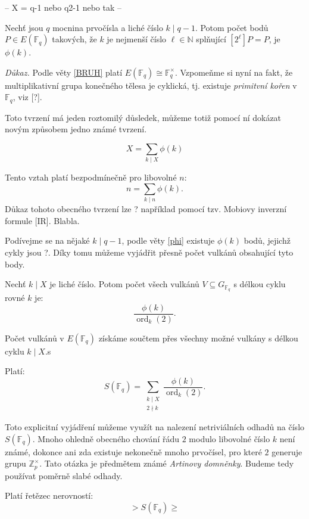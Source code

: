 \documentclass[12pt]{report}
\DeclareMathOperator{\ord}{ord}
\begin{document}
--
X = q-1 nebo q2-1 nebo tak
--
\begin{lemma}\label{phi}
Nechť jsou $q$ mocnina prvočísla a liché číslo $k \mid q-1$. Potom počet bodů $P \in E(\mathbb{F}_q)$ takových, že $k$ je nejmenší číslo $\ell \in \mathbb{N}$ splňující $[2^{\ell}]P = P$, je $\phi(k)$.
\end{lemma}
\noindent \textit{Důkaz.} Podle věty \ref{BRUH} platí $E(\mathbb{F}_q) \cong \mathbb{F}_q ^{\times}$. Vzpomeňme si nyní na fakt, že multiplikativní grupa konečného tělesa je cyklická, tj. existuje \textit{primitvní kořen} v $\mathbb{F}_q$, viz [?].  

Toto tvrzení má jeden roztomilý důsledek, můžeme totiž pomocí ní dokázat novým způsobem jedno známé tvrzení.

\begin{dusledek}
$$ X = \sum_{k \mid X} \phi(k)$$
\end{dusledek}

Tento vztah platí bezpodmínečně pro libovolné $n$:
$$n = \sum_{k \mid n} \phi(k).$$
Důkaz tohoto obecného tvrzení lze ? například pomocí tzv. Mobiovy inverzní formule [IR].  Blabla.

Podívejme se na nějaké $k \mid q-1$, podle věty \ref{phi} existuje $\phi(k)$ bodů, jejichž cykly jsou ?. Díky tomu můžeme vyjádřit přesně počet vulkánů obsahující tyto body.


\begin{dusledek}
Nechť $k \mid X$ je liché číslo.  Potom počet všech vulkánů $V \subseteq G_{\mathbb{F}_q}$ s délkou cyklu rovné $k$ je:
$$\frac{\phi(k)}{\ord_k (2)}.$$
\end{dusledek}

Počet vulkánů v $E(\mathbb{F}_q)$ získáme součtem přes všechny možné vulkány s délkou cyklu $k \mid X$.s

\begin{veta}
Platí:
$$S(\mathbb{F}_q) = \sum_{\substack{k \mid X \\ 2 \nmid k}} \frac{\phi(k)}{\ord_k (2)}.$$
\end{veta}

Toto explicitní vyjádření můžeme využít na nalezení netriviálních odhadů na číslo $S(\mathbb{F}_q)$. Mnoho ohledně obecného chování řádu $2$ modulo libovolné číslo $k$ není známé, dokonce ani zda existuje nekonečně mnoho prvočísel, pro které $2$ generuje grupu $\mathbb{Z}_{p} ^{\times}$. Tato otázka je předmětem známé \textit{Artinovy domněnky}. Budeme tedy používat poměrně slabé odhady.

\begin{veta} 
Platí řetězec nerovností:
$$ > S(\mathbb{F}_q) \geqslant$$
\end{veta}
\end{document}
